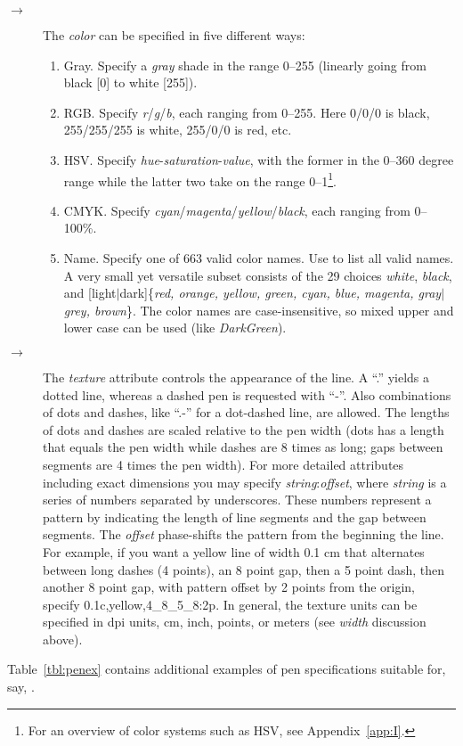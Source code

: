 \begin{description}
%
\item[$\rightarrow$]The \emph{color} can be specified in five different ways:
\begin{enumerate}
\item Gray. Specify a \emph{gray} shade in the range 0--255 (linearly going from black [0] to white [255]).
\item RGB. Specify \emph{r}/\emph{g}/\emph{b}, each ranging from 0--255.  Here 0/0/0 is black, 255/255/255 is white,
255/0/0 is red, etc.
\item HSV. Specify \emph{hue}-\emph{saturation}-\emph{value}, with the former in the 0--360 degree range while the latter
two take on the range 0--1\footnote{For an overview of color systems such as HSV, see Appendix~\ref{app:I}.}.
\item CMYK. Specify \emph{cyan}/\emph{magenta}/\emph{yellow}/\emph{black}, each ranging from 0--100\%.
\item Name.  Specify one of 663 valid color names.  Use  to list all valid names.
A very small yet versatile subset consists of the 29 choices \emph{white}, \emph{black}, and
[light$|$dark]\{\emph{red,
orange, yellow, green, cyan, blue, magenta, gray$|$grey, brown}\}.
The color names are case-insensitive, so mixed upper and lower case can be used (like
\emph{DarkGreen}).
\end{enumerate}

%
\item[$\rightarrow$]The \emph{texture} attribute controls the appearance
of the line.  A ``.'' yields a dotted line, whereas a dashed pen is requested with ``-''.
Also combinations of dots and dashes, like ``.-'' for a dot-dashed line, are allowed.
The lengths of dots and dashes are scaled relative to the pen width (dots has
a length that equals the pen width while dashes are 8 times as long; gaps between
segments are 4 times the pen width).
For more detailed attributes including exact dimensions you may specify \emph{string}:\emph{offset},
where \emph{string} is a series of numbers separated by underscores.
These numbers represent a pattern by indicating the length of line
segments and the gap between segments.  The \emph{offset} phase-shifts the
pattern from the beginning the line.  For example, if you want a yellow line of width
0.1 cm that alternates between long dashes (4 points), an 8 point gap, then
a 5 point dash, then another 8 point gap, with pattern offset by 2 points
from the origin, specify 0.1c,yellow,4\_8\_5\_8:2p.
In general, the texture units can be specified in dpi units, cm, inch, points,
or meters (see \emph{width} discussion above). 
\end{description} 
Table~\ref{tbl:penex} contains additional examples of pen specifications suitable for, say, .

